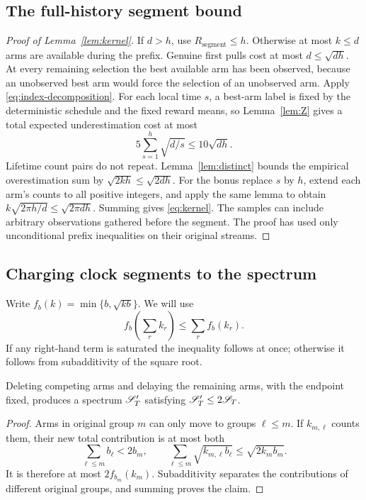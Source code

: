 \subsection{The full-history segment bound}
\begin{proof}[Proof of Lemma~\ref{lem:kernel}]
If $d>h$, use $R_{\mathrm{segment}}\le h$. Otherwise at most $k\le d$ arms are available during the prefix. Genuine first pulls cost at most $d\le\sqrt{dh}$. At every remaining selection the best available arm has been observed, because an unobserved best arm would force the selection of an unobserved arm. Apply \eqref{eq:index-decomposition}. For each local time $s$, a best-arm label is fixed by the deterministic schedule and the fixed reward means, so Lemma~\ref{lem:Z} gives a total expected underestimation cost at most
\[
 5\sum_{s=1}^h\sqrt{d/s}\le10\sqrt{dh}.
\]
Lifetime count pairs do not repeat. Lemma~\ref{lem:distinct} bounds the empirical overestimation sum by $\sqrt{2kh}\le\sqrt{2dh}$. For the bonus replace $s$ by $h$, extend each arm's counts to all positive integers, and apply the same lemma to obtain $k\sqrt{2\pi h/d}\le\sqrt{2\pi dh}$. Summing gives \eqref{eq:kernel}. The samples can include arbitrary observations gathered before the segment. The proof has used only unconditional prefix inequalities on their original streams.
\end{proof}

\subsection{Charging clock segments to the spectrum}
Write $f_b(k)=\min\{b,\sqrt{kb}\}$. We will use
\[
 f_b\left(\sum_r k_r\right)\le\sum_r f_b(k_r).
\]
If any right-hand term is saturated the inequality follows at once; otherwise it follows from subadditivity of the square root.

\begin{lemma}\label{lem:delay}
Deleting competing arms and delaying the remaining arms, with the endpoint fixed, produces a spectrum $\mathscr S_T'$ satisfying $\mathscr S_T'\le2\mathscr S_T$.
\end{lemma}
\begin{proof}
Arms in original group $m$ can only move to groups $\ell\le m$. If $k_{m,\ell}$ counts them, their new total contribution is at most both
\[
 \sum_{\ell\le m}b_\ell<2b_m,
 \qquad
 \sum_{\ell\le m}\sqrt{k_{m,\ell}b_\ell}
 \le\sqrt{2k_mb_m}.
\]
It is therefore at most $2f_{b_m}(k_m)$. Subadditivity separates the contributions of different original groups, and summing proves the claim.
\end{proof}

